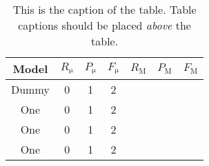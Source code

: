 \documentclass[10pt, a4paper]{article}
\begin{document}
\begin{table}
	\caption{This is the caption of the table. Table captions should be placed \textit{above} the table.}
	\label{tab:narrow-table}
	\begin{center}
		\begin{tabular}{c|ccc|ccc}
			\toprule
			Model & $R_\mathrm{\mu}$ & $P_\mathrm{\mu}$ & $F_\mathrm{\mu}$ & $R_\mathrm{M}$ & $P_\mathrm{M}$ & $F_\mathrm{M}$\\
			\midrule
			Dummy & 0 & 1 & 2 \\
			One & 0 & 1 & 2 \\
			One & 0 & 1 & 2 \\
			\midrule
			One & 0 & 1 & 2 \\
			\bottomrule
		\end{tabular}
	\end{center}
\end{table}



\end{document}
